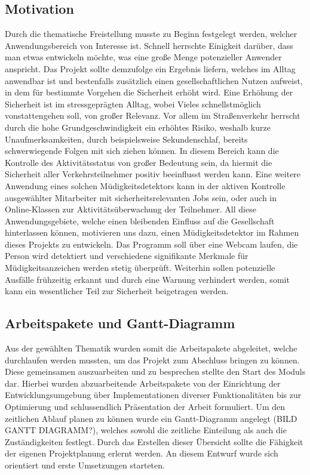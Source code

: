 \subsection{Motivation}
Durch die thematische Freistellung musste zu Beginn festgelegt werden, welcher Anwendungsbereich von Interesse ist. Schnell herrschte Einigkeit darüber, dass man etwas entwickeln möchte, was eine große Menge potenzieller Anwender anspricht. Das Projekt sollte demzufolge ein Ergebnis liefern, welches im Alltag anwendbar ist und bestenfalls zusätzlich einen gesellschaftlichen Nutzen aufweist, in dem für bestimmte Vorgehen die Sicherheit erhöht wird. Eine Erhöhung der Sicherheit ist im stressgeprägten Alltag, wobei Vieles schnellstmöglich vonstattengehen soll, von großer Relevanz. Vor allem im Straßenverkehr herrscht durch die hohe Grundgeschwindigkeit ein erhöhtes Risiko, weshalb kurze Unaufmerksamkeiten, durch beispielsweise Sekundenschlaf, bereits schwerwiegende Folgen mit sich ziehen können. In diesem Bereich kann die Kontrolle des Aktivitätsstatus von großer Bedeutung sein, da hiermit die Sicherheit aller Verkehrsteilnehmer positiv beeinflusst werden kann. Eine weitere Anwendung eines solchen Müdigkeitsdetektors kann in der aktiven Kontrolle ausgewählter Mitarbeiter mit sicherheitsrelevanten Jobs sein, oder auch in Online-Klassen zur Aktivitätsüberwachung der Teilnehmer. All diese Anwendungsgebiete, welche einen bleibenden Einfluss auf die Gesellschaft hinterlassen können, motivieren uns dazu, einen Müdigkeitsdetektor im Rahmen dieses Projekts zu entwickeln. Das Programm soll über eine Webcam laufen, die Person wird detektiert und verschiedene signifikante Merkmale für Müdigkeitsanzeichen werden stetig überprüft. Weiterhin sollen potenzielle Ausfälle frühzeitig erkannt und durch eine Warnung verhindert werden, somit kann ein wesentlicher Teil zur Sicherheit beigetragen werden.

\subsection{Arbeitspakete und Gantt-Diagramm}
Aus der gewählten Thematik wurden somit die Arbeitspakete abgeleitet, welche durchlaufen werden mussten, um das Projekt zum Abschluss bringen zu können. Diese gemeinsamen auszuarbeiten und zu besprechen stellte den Start des Moduls dar. Hierbei wurden abzuarbeitende Arbeitspakete von der Einrichtung der Entwicklungsumgebung über Implementationen diverser Funktionalitäten bis zur Optimierung und schlussendlich Präsentation der Arbeit formuliert. Um den zeitlichen Ablauf planen zu können wurde ein Gantt-Diagramm angelegt (BILD GANTT DIAGRAMM?), welches sowohl die zeitliche Einteilung als auch die Zuständigkeiten festlegt. Durch das Erstellen dieser Übersicht sollte die Fähigkeit der eigenen Projektplanung erlernt werden. An diesem Entwurf wurde sich orientiert und erste Umsetzungen starteten.
